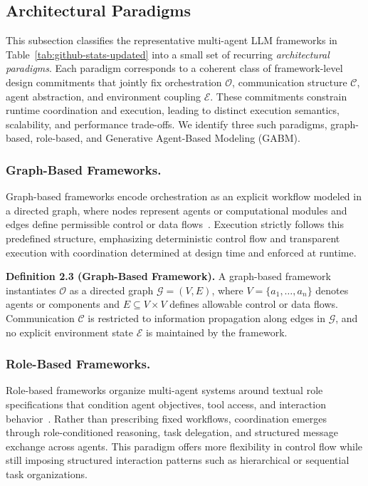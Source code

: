 

\vspace{-3mm}
\subsection{Architectural Paradigms}
\label{sec:background}

This subsection classifies the representative multi-agent LLM frameworks in Table~\ref{tab:github-stats-updated} into a small set of recurring \emph{architectural paradigms}. Each paradigm corresponds to a coherent class of framework-level design commitments that jointly fix orchestration $\mathcal{O}$, communication structure $\mathcal{C}$, agent abstraction, and environment coupling $\mathcal{E}$. These commitments constrain runtime coordination and execution, leading to distinct execution semantics, scalability, and performance trade-offs. We identify three such paradigms, graph-based, role-based, and Generative Agent-Based Modeling (GABM).


\vspace{-3mm}
\subsubsection{Graph-Based Frameworks.}
Graph-based frameworks encode orchestration as an explicit workflow modeled in a directed graph, where nodes represent agents or computational modules and edges define permissible control or data flows~\cite{langgraph2025, langflow2025, n8n2025}. Execution strictly follows this predefined structure, emphasizing deterministic control flow and transparent execution with coordination determined at design time and enforced at runtime.


\noindent\textbf{Definition 2.3 (Graph-Based Framework).}
A graph-based framework instantiates $\mathcal{O}$ as a directed graph $\mathcal{G}=(V,E)$, where $V=\{a_1,\ldots,a_n\}$ denotes agents or components and $E\subseteq V\times V$ defines allowable control or data flows. Communication $\mathcal{C}$ is restricted to information propagation along edges in $\mathcal{G}$, and no explicit environment state $\mathcal{E}$ is maintained by the framework.


\subsubsection{Role-Based Frameworks.}
Role-based frameworks organize multi-agent systems around textual role specifications that condition agent objectives, tool access, and interaction behavior~\cite{crewai2025,openaiagents2025,wu2024autogen,agno2025,OpenAgents}. Rather than prescribing fixed workflows, coordination emerges through role-conditioned reasoning, task delegation, and structured message exchange across agents. This paradigm offers more flexibility in control flow while still imposing structured interaction patterns such as hierarchical or sequential task organizations.



